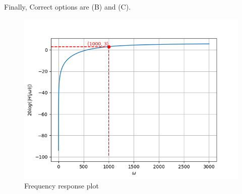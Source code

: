 \documentclass[journal,12pt,twocolumn]{IEEEtran}
\theoremstyle{remark}
\begin{document}
Finally, Correct options are (B) and (C).

\begin{figure}[H]
  \centering
  \includegraphics[width=1.0\columnwidth]{figs/plot1.png}
  \caption{\centering Frequency response plot}
  \label{fig:fig1}
\end{figure}
\end{document}
